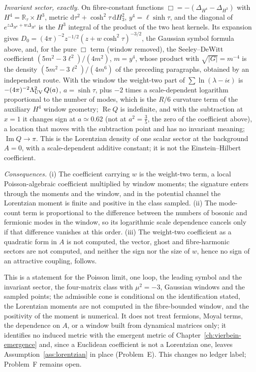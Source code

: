 \emph{Invariant sector, exactly.} On fibre-constant functions \(\Box=-(\Delta_{H^4}-\Delta_{H^3})\) with \(H^4=\mathbb R_\tau\times H^3\), metric \(\mathrm d\tau^2+\cosh^2\tau\,\mathrm dH_3^2\), \(y^4=\ell\sinh\tau\), and the diagonal of \(e^{z\Delta_{H^4}+w\Delta_{H^3}}\) is the \(H^3\) integral of the product of the two heat kernels. Its expansion gives \(D_0=(4\pi)^{-2}z^{-1/2}(z+w\cosh^2\tau)^{-3/2}\), the Gaussian symbol formula above, and, for the pure \(\Box\) term (window removed), the Seeley--DeWitt coefficient \((5m^2-3\ell^2)/(4m^2)\), \(m=y^4\), whose product with \(\sqrt{|G|}=m^{-4}\) is the density \((5m^2-3\ell^2)/(4m^6)\) of the preceding paragraphs, obtained by an independent route. With the window the weight-two part of \(\sum\ln(\lambda-i\epsilon)\) is \(-(4\pi)^{-2}\Lambda_{\mathrm{UV}}^2\,Q(a)\), \(a=\sinh\tau\), plus \(-2\) times a scale-dependent logarithm proportional to the number of modes, which is the \(R/6\) curvature term of the auxiliary \(H^4\) window geometry; \(\operatorname{Re}Q\) is indefinite, and with the subtraction at \(x=1\) it changes sign at \(a\simeq0.62\) (not at \(a^2=\tfrac35\), the zero of the coefficient above), a location that moves with the subtraction point and has no invariant meaning; \(\operatorname{Im}Q\to\pi\). This is the Lorentzian density of one scalar sector at the background \(A=0\), with a scale-dependent additive constant; it is not the Einstein--Hilbert coefficient.

\emph{Consequences.} (i) The coefficient carrying \(w\) is the weight-two term, a local Poisson-algebraic coefficient multiplied by window moments; the signature enters through the moments and the window, and in the potential channel the Lorentzian moment is finite and positive in the class sampled. (ii) The mode-count term is proportional to the difference between the numbers of bosonic and fermionic modes in the window, so its logarithmic scale dependence cancels only if that difference vanishes at this order. (iii) The weight-two coefficient as a quadratic form in \(A\) is not computed, the vector, ghost and fibre-harmonic sectors are not computed, and neither the sign nor the size of \(w\), hence no sign of an attractive coupling, follows.

This is a statement for the Poisson limit, one loop, the leading symbol and the invariant sector, the four-matrix class with \(\mu^2=-3\), Gaussian windows and the sampled points; the admissible cone is conditional on the identification stated, the Lorentzian moments are not computed in the fibre-bounded window, and the positivity of the moment is numerical. It does not treat fermions, Moyal terms, the dependence on \(A\), or a window built from dynamical matrices only; it identifies no induced metric with the emergent metric of Chapter~\ref{ch:vierbein-emergence} and, since a Euclidean coefficient is not a Lorentzian one, leaves Assumption~\ref{ass:lorentzian} in place (Problem~E). This changes no ledger label; Problem~F remains open.

